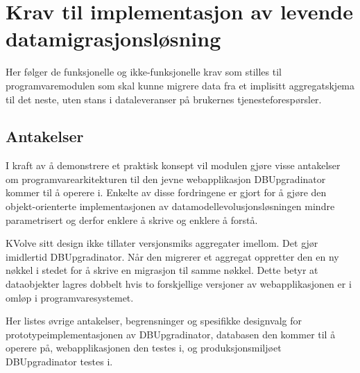 \section{Krav til implementasjon av levende datamigrasjonsløsning}

Her følger de funksjonelle og ikke-funksjonelle krav som stilles til programvaremodulen som skal kunne migrere data fra et implisitt aggregatskjema til det neste, uten stans i dataleveranser på brukernes tjenesteforespørsler.

\subsection{Antakelser}

I kraft av å demonstrere et praktisk konsept vil modulen gjøre visse antakelser om programvarearkitekturen til den jevne webapplikasjon DBUpgradinator kommer til å operere i. Enkelte av disse fordringene er gjort for å gjøre den objekt-orienterte implementasjonen av datamodellevolusjonsløsningen mindre parametrisert og derfor enklere å skrive og enklere å forstå.

KVolve sitt design ikke tillater versjonsmiks aggregater imellom. Det gjør imidlertid DBUpgradinator. Når den migrerer et aggregat oppretter den en ny nøkkel i stedet for å skrive en migrasjon til samme nøkkel. Dette betyr at dataobjekter lagres dobbelt hvis to forskjellige versjoner av webapplikasjonen er i omløp i programvaresystemet.

Her listes øvrige antakelser, begrensninger og spesifikke designvalg for prototypeimplementasjonen av DBUpgradinator, databasen den kommer til å operere på, webapplikasjonen den testes i, og produksjonsmiljøet DBUpgradinator testes i.

